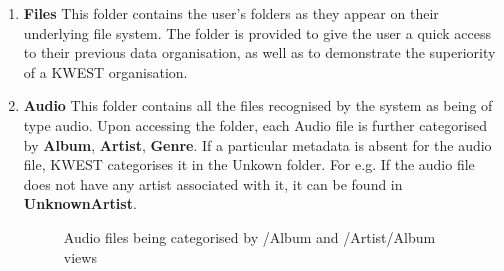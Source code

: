 \begin{enumerate}
\item \textbf{Files} \newline
This folder contains the user's folders as they  appear on their underlying file system. The folder is provided to give the user a quick access to their previous data organisation, as well as to demonstrate the superiority of a KWEST organisation.
\item \textbf{Audio} \newline
This folder contains all the files recognised by the system as being of type audio. Upon accessing the folder, each Audio file is further categorised by \textbf{Album}, \textbf{Artist}, \textbf{Genre}. If a particular metadata is absent for the audio file, KWEST categorises it in the Unkown folder. \newline
For e.g. If the audio file does not have any artist associated with it, it can be found in \textbf{UnknownArtist}.
\begin{figure}[htb]
\centering
\setlength\fboxsep{0pt}
\setlength\fboxrule{0.5pt}
\caption{Audio files being categorised by /Album and /Artist/Album views}
\label{fig:dfd0}
\end{figure}


\end{enumerate}

